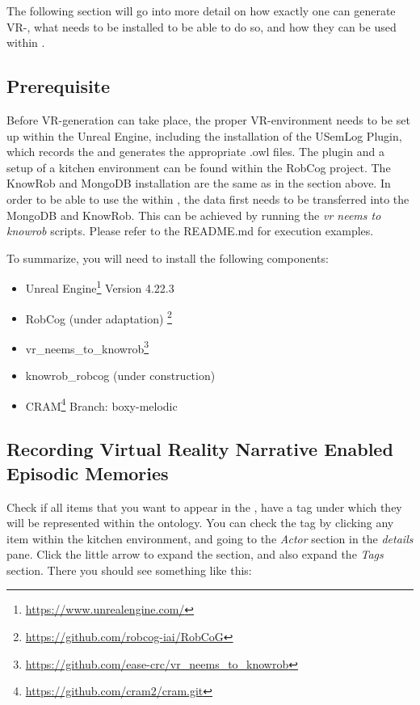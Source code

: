 The following section will go into more detail on how exactly one can generate VR-\neems, what needs to be installed to be able to do so, and how they can be used within \cram.

\subsection{Prerequisite}
Before VR-\neem generation can take place, the proper VR-environment needs to be set up within the Unreal Engine, including the installation of the USemLog Plugin, which records the \neems and generates the appropriate .owl files. The plugin and a setup of a kitchen environment can be found within the RobCog project. 
The KnowRob and MongoDB installation are the same as in the section above. 
In order to be able to use the \neems within \cram, the data first needs to be transferred into the MongoDB and KnowRob. This can be achieved by running the \textit{vr neems to knowrob} scripts. Please refer to the README.md for execution examples.

 
To summarize, you will need to install the following components: 
\begin{itemize}
	\item Unreal Engine\footnote{\url{https://www.unrealengine.com/}} Version 4.22.3
	\item RobCog (under adaptation) \footnote{\url{https://github.com/robcog-iai/RobCoG}}
	\item vr\_neems\_to\_knowrob\footnote{\url{https://github.com/ease-crc/vr_neems_to_knowrob}} 
	\item knowrob\_robcog (under construction) 
	\item CRAM\footnote{\url{https://github.com/cram2/cram.git}} Branch: boxy-melodic

\end{itemize}

\subsection{Recording Virtual Reality Narrative Enabled Episodic Memories}
Check if all items that you want to appear in the \neems, have a tag under which they will be represented within the ontology. You can check the tag by clicking any item within the kitchen environment, and going to the \textit{Actor} section in the \textit{details} pane. Click the little arrow to expand the section, and also expand the \textit{Tags} section. There you should see something like this:

